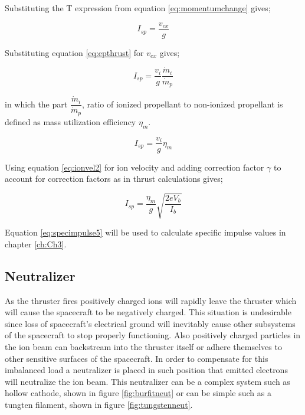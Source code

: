 Substituting the T expression from equation \ref{eq:momentumchange} gives;

\begin{equation}
    I_{sp} = \frac{v_{ex}}{g}
    \label{eq:specimpulse2}
\end{equation}

Substituting equation \ref{eq:epthrust} for $v_{ex}$ gives;

\begin{equation}
    I_{sp} = \frac{v_i}{g}\frac{\dot{m}_i}{\dot{m}_p}
    \label{eq:specimpulse3}
\end{equation}

in which the part $\dfrac{\dot{m}_i}{\dot{m}_p}$, ratio of ionized propellant to non-ionized propellant is defined as mass utilization efficiency $\eta_m$.

\begin{equation}
    I_{sp} = \frac{v_i}{g}\eta_m
    \label{eq:specimpulse4}
\end{equation}

Using equation \ref{eq:ionvel2} for ion velocity and adding correction factor $\gamma$ to account for correction factors as in thrust calculations gives;

\begin{equation}
    I_{sp} = \frac{\eta_m}{g}\sqrt{\frac{2e V_b}{I_b}}
    \label{eq:specimpulse5}
\end{equation}

Equation \ref{eq:specimpulse5} will be used to calculate specific impulse values in chapter \ref{ch:Ch3}.

\subsection{Neutralizer}
As the thruster fires positively charged ions will rapidly leave the thruster which will cause the spacecraft to be negatively charged. This situation is undesirable since loss of spacecraft's electrical ground will inevitably cause other subsystems of the spacecraft to stop properly functioning. Also positively charged particles in the ion beam can backstream into the thruster itself or adhere themselves to other sensitive surfaces of the spacecraft.  In order to compensate for this imbalanced load a neutralizer is placed in such position that emitted electrons will neutralize the ion beam. This neutralizer can be a complex system such as hollow cathode, shown in figure \ref{fig:burfitneut} or can be simple such as a tungten filament, shown in figure \ref{fig:tungstenneut}. 

